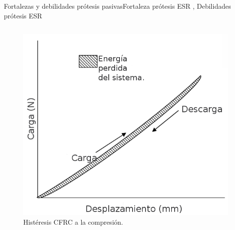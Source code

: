 \documentclass[10pt]{beamer}
\begin{document}
\begin{frame}{Fortalezas y debilidades prótesis pasivas}{Fortaleza prótesis ESR \cite{Zelik2014}, Debilidades prótesis ESR \cite{Varol2010,Weber2014,Au2008,Morgenroth2011,Martinez-Villalpando2009,Esposito2015,DeAsha2014}}

\begin{columns}[t]

\column{55 mm}

\begin{figure}
\begin{centering}
\includegraphics[scale=0.25]{Feathergraphics/hystheresis}
\par\end{centering}
\caption{\footnotesize{Histéresis CFRC a la compresión.\cite{Nolan2008}}}
\end{figure}

\column{50 mm}



\end{columns}
\end{frame}
\end{document}
